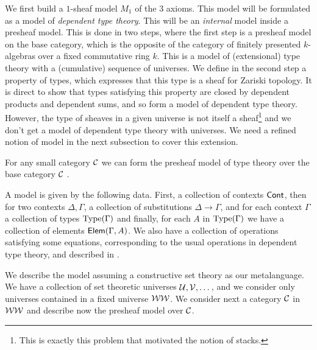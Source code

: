 We first build a $1$-sheaf model $M_1$ of the 3 axioms. This model will be formulated as a model of {\em dependent type theory}.
This will be an {\em internal} model inside a presheaf model. This is done in two steps, where the first step is a presheaf model
on the base category, which is the opposite of the category of finitely presented $k$-algebras over a fixed commutative ring $k$.
This is a model of (extensional) type theory with a (cumulative) sequence of universes. We define in the second step a property
of types, which expresses that this type is a sheaf for Zariski topology. It is direct to show that types satisfying this property are
closed by dependent products and dependent sums, and so form a model of dependent type theory.
However, the type of sheaves in a given universe is not itself a sheaf\footnote{This is exactly this problem that motivated the notion
of stacks.} and we don't get a model of dependent type theory with universes. We need a refined notion of model in the next subsection
to cover this extension.

For any small category $\mathcal{C}$ we can form the presheaf model of type theory over the base category $\mathcal{C}$ \cite{hofmann,huber-phd-thesis}.

A model is given by the following data. First, a collection of contexts $\mathsf{Cont}$,
then for two contexts $\Delta,\Gamma$, a collection of substitutions $\Delta\rightarrow\Gamma$, and for each context $\Gamma$
a collection of types $\mathrm{Type}(\Gamma)$ and finally, for each $A$ in $\mathrm{Type}(\Gamma)$ we have a collection of elements
$\mathsf{Elem}(\Gamma,A)$. We also have a collection of operations satisfying some equations, corresponding to the usual operations in
dependent type theory, and described in \cite{huber-phd-thesis}. 

We describe the model assuming a constructive set theory as our metalanguage. We have a collection of set theoretic universes
$\mathcal{U},\mathcal{V},\dots$, and we consider only universes contained in a fixed universe $\mathcal{WW}$. We consider next a category $\mathcal{C}$ in $\mathcal{WW}$
and describe now the presheaf model over $\mathcal{C}$.

